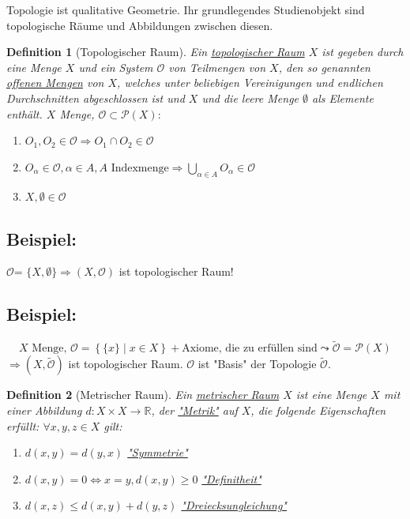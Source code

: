 \documentclass[a4paper,11pt,notitlepage]{report}
\newtheorem{definition}{Definition}[chapter]
\newcommand{\R}{{\ensuremath{\mathbb{R}}}}
\newcommand{\OO}{{\ensuremath{\mathcal{O}}}}
\newenvironment{bsp}[1]
{
\setlength{\fboxsep}{10pt}
\subsection*{Beispiel: #1}
\begin{upshape}
}
{
\end{upshape}
}
\begin{document}
Topologie ist qualitative Geometrie. Ihr grundlegendes Studienobjekt sind topologische Räume und Abbildungen zwischen diesen.

\begin{definition}[Topologischer Raum]
Ein \underline{topologischer Raum} $X$ ist gegeben durch eine Menge $X$ und ein System $\OO$ von Teilmengen von $X$, den so genannten \underline{offenen Mengen} von $X$, welches unter beliebigen Vereinigungen und endlichen Durchschnitten abgeschlossen ist und $X$ und die leere Menge $\emptyset$ als Elemente enthält.
\newline
$X$ Menge, $\OO \subset \mathcal{P}(X) \colon$
\begin{enumerate}[(1)]
	\item $O_1, O_2 \in \OO \Rightarrow O_1 \cap O_2 \in \OO$
	\item $O_\alpha \in \OO, \alpha \in A, A \text{ Indexmenge} \Rightarrow \bigcup\limits_{\alpha \in A}{O_\alpha} \in \OO$
	\item $X, \emptyset \in \OO$
\end{enumerate}
\end{definition}

\begin{bsp}{}
\OO = $\{X, \emptyset\} \Rightarrow (X,\OO)$ ist topologischer Raum!
\end{bsp}

\begin{bsp}{}
$$X \text{ Menge, }\OO = \left\{\{x\} \mid x\in X\right\} + \text{Axiome, die zu erfüllen sind} \leadsto \tilde{\OO} = \mathcal{P}(X)$$
$\Rightarrow (X,\tilde{\OO})$ ist topologischer Raum.
$\OO$ ist "Basis" der Topologie $\tilde{\OO}$.
\end{bsp}

\begin{definition}[Metrischer Raum]
Ein \underline{metrischer Raum} $X$ ist eine Menge $X$ mit einer Abbildung $d \colon X \times X \rightarrow \R$, der \underline{"Metrik"} auf $X$, die folgende Eigenschaften erfüllt:
$\forall x,y,z \in X$ gilt:
\begin{enumerate}[(1)]
	\item $d(x,y) = d(y,x)$ \underline{"Symmetrie"}
	\item $d(x,y) = 0 \Leftrightarrow x = y, d(x,y) \geq 0$ \underline{"Definitheit"}
	\item $d(x,z) \leq d(x,y) + d(y,z)$ \underline{"Dreiecksungleichung"}
\end{enumerate}
\end{definition}
\end{document}
